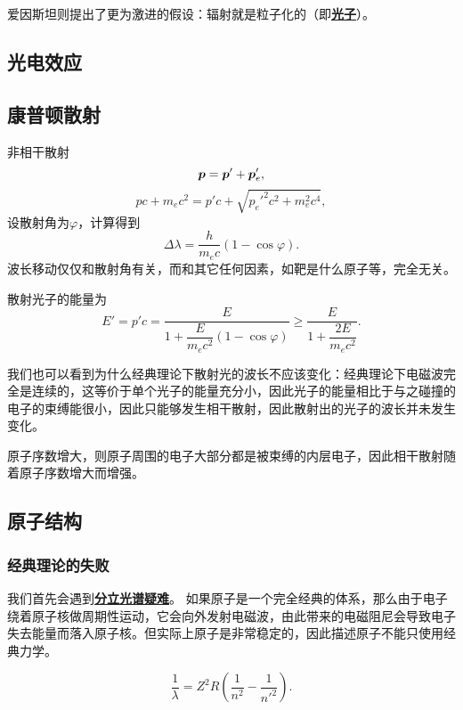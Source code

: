 \documentclass[UTF8, a4paper]{ctexart}
\newcommand{\concept}[1]{\underline{\textbf{#1}}}
\begin{document}
爱因斯坦则提出了更为激进的假设：辐射就是粒子化的（即\concept{光子}）。

\subsection{光电效应}

\subsection{康普顿散射}

非相干散射
\[
    \vb*{p} = \vb*{p}' + \vb*{p}'_e,
\]
\[
    pc + m_e c^2 = p' c + \sqrt{{p_e'}^2 c^2 + m_e^2 c^4},
\]
设散射角为$\varphi$，计算得到
\begin{equation}
    \Delta \lambda = \frac{h}{m_e c} (1 - \cos \varphi).
\end{equation}
波长移动仅仅和散射角有关，而和其它任何因素，如靶是什么原子等，完全无关。

散射光子的能量为
\begin{equation}
    E' = p'c = \frac{E}{1 + \dfrac{E}{m_e c^2}(1 - \cos \varphi)} \geq \frac{E}{1 + \dfrac{2 E}{m_e c^2}}.
\end{equation}

我们也可以看到为什么经典理论下散射光的波长不应该变化：经典理论下电磁波完全是连续的，这等价于单个光子的能量充分小，因此光子的能量相比于与之碰撞的电子的束缚能很小，因此只能够发生相干散射，因此散射出的光子的波长并未发生变化。

原子序数增大，则原子周围的电子大部分都是被束缚的内层电子，因此相干散射随着原子序数增大而增强。

\subsection{原子结构}

\subsubsection{经典理论的失败}

我们首先会遇到\concept{分立光谱疑难}。
如果原子是一个完全经典的体系，那么由于电子绕着原子核做周期性运动，它会向外发射电磁波，由此带来的电磁阻尼会导致电子失去能量而落入原子核。但实际上原子是非常稳定的，因此描述原子不能只使用经典力学。

\begin{equation}
    \frac{1}{\lambda} = Z^2 R \left( \frac{1}{n^2} - \frac{1}{n'^2} \right).
\end{equation}
\end{document}
